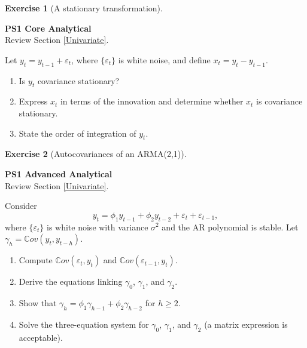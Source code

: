 \documentclass[
  11pt,
]{book}
\providecommand{\tightlist}{%
  \setlength{\itemsep}{0pt}\setlength{\parskip}{0pt}}
\theoremstyle{definition}
\theoremstyle{definition}
\theoremstyle{definition}
\newtheorem{exercise}{Exercise}[chapter]
\theoremstyle{definition}
\theoremstyle{remark}
\begin{document}

\begin{exercisebox}

\begin{exercise}[A stationary transformation]
\protect\hypertarget{exr:ex-stationarity-transformation}{}\label{exr:ex-stationarity-transformation}

\textbf{PS1 \textbar{} Core \textbar{} Analytical}\\
Review Section \ref{Univariate}.

Let \(y_t=y_{t-1}+\varepsilon_t\), where \(\{\varepsilon_t\}\) is white noise, and define \(x_t=y_t-y_{t-1}\).

\begin{enumerate}
\def\labelenumi{\arabic{enumi}.}
\tightlist
\item
  Is \(y_t\) covariance stationary?
\item
  Express \(x_t\) in terms of the innovation and determine whether \(x_t\) is covariance stationary.
\item
  State the order of integration of \(y_t\).
\end{enumerate}

\end{exercise}

\end{exercisebox}


\begin{exercisebox}

\begin{exercise}[Autocovariances of an ARMA(2,1)]
\protect\hypertarget{exr:ex-arma-autocovariances}{}\label{exr:ex-arma-autocovariances}

\textbf{PS1 \textbar{} Advanced \textbar{} Analytical}\\
Review Section \ref{Univariate}.

Consider
\[
y_t=\phi_1y_{t-1}+\phi_2y_{t-2}+\varepsilon_t+\varepsilon_{t-1},
\]
where \(\{\varepsilon_t\}\) is white noise with variance \(\sigma^2\) and the AR polynomial is stable. Let \(\gamma_h=\mathbb{C}ov(y_t,y_{t-h})\).

\begin{enumerate}
\def\labelenumi{\arabic{enumi}.}
\tightlist
\item
  Compute \(\mathbb{C}ov(\varepsilon_t,y_t)\) and \(\mathbb{C}ov(\varepsilon_{t-1},y_t)\).
\item
  Derive the equations linking \(\gamma_0\), \(\gamma_1\), and \(\gamma_2\).
\item
  Show that \(\gamma_h=\phi_1\gamma_{h-1}+\phi_2\gamma_{h-2}\) for \(h\geq2\).
\item
  Solve the three-equation system for \(\gamma_0\), \(\gamma_1\), and \(\gamma_2\) (a matrix expression is acceptable).
\end{enumerate}

\end{exercise}

\end{exercisebox}
\end{document}
